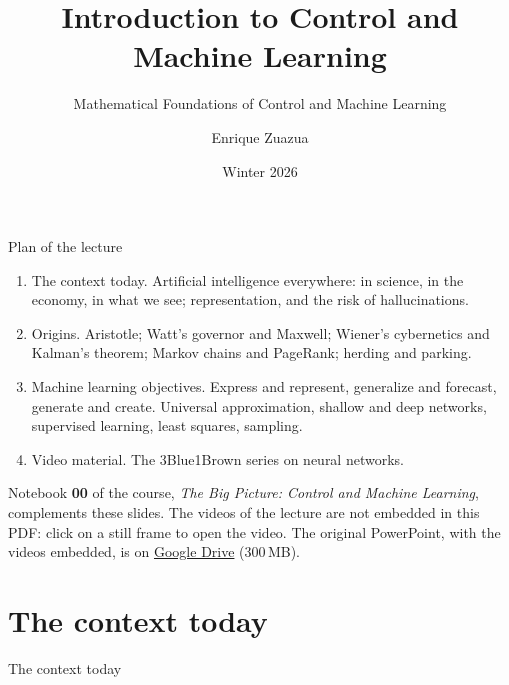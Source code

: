 \documentclass[10pt]{beamer}
\title{Introduction to Control and Machine Learning}
\subtitle{Mathematical Foundations of Control and Machine Learning}
\author{Enrique Zuazua}
\date{Winter 2026}
\institute{FAU Erlangen-N\"urnberg}
\begin{document}
\maketitle

\begin{frame}{Plan of the lecture}
\begin{enumerate}
\item \alert{The context today.} Artificial intelligence everywhere: in science, in the economy, in what we see; representation, and the risk of hallucinations.
\item \alert{Origins.} Aristotle; Watt's governor and Maxwell; Wiener's cybernetics and Kalman's theorem; Markov chains and PageRank; herding and parking.
\item \alert{Machine learning objectives.} Express and represent, generalize and forecast, generate and create. Universal approximation, shallow and deep networks, supervised learning, least squares, sampling.
\item \alert{Video material.} The 3Blue1Brown series on neural networks.
\end{enumerate}

\bigskip
\small
Notebook \textbf{00} of the course, \emph{The Big Picture: Control and Machine Learning}, complements these slides. The videos of the lecture are not embedded in this PDF: click on a still frame to open the video. The original PowerPoint, with the videos embedded, is on \href{https://drive.google.com/file/d/1iTSIfdrd_4o3Lwf-c-V_9y__BtAXT8Vc/view}{Google Drive} (300\,MB).
\end{frame}


\section{The context today}

\begin{frame}[standout]
The context today
\end{frame}
\end{document}

